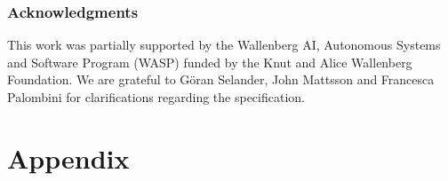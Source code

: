 \documentclass[runningheads,draft,x11names]{llncs}
\begin{document}
\subsubsection*{Acknowledgments} This work was partially supported by
the Wallenberg AI, Autonomous Systems and Software Program (WASP) funded by
the Knut and Alice Wallenberg Foundation.
%
We are grateful to G\"oran Selander, John Mattsson and Francesca Palombini for
clarifications regarding the specification.
%





\appendix
\section*{Appendix}


\end{document}
